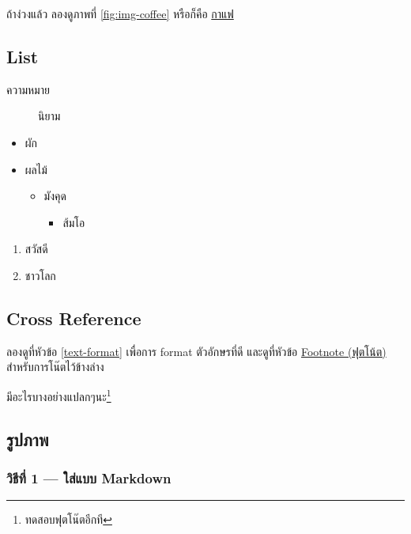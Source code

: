 \documentclass[
]{article}
\providecommand{\tightlist}{%
  \setlength{\itemsep}{0pt}\setlength{\parskip}{0pt}}
\begin{document}
ถ้าง่วงแล้ว ลองดูภาพที่ \ref{fig:img-coffee} หรือก็คือ \protect\hyperlink{coffee}{กาแฟ}

\hypertarget{list}{%
\subsection{List}\label{list}}

\begin{description}
\item[ความหมาย]
นิยาม
\end{description}

\begin{itemize}
\item
  ผัก
\item
  ผลไม้

  \begin{itemize}
  \item
    มังคุด

    \begin{itemize}
    \tightlist
    \item
      ส้มโอ
    \end{itemize}
  \end{itemize}
\end{itemize}

\begin{enumerate}
\def\labelenumi{\arabic{enumi}.}
\tightlist
\item
  สวัสดี
\item
  ชาวโลก
\end{enumerate}

\hypertarget{cross-reference}{%
\subsection{Cross Reference}\label{cross-reference}}

ลองดูที่หัวข้อ \ref{text-format} เพื่อการ format ตัวอักษรที่ดี และดูที่หัวข้อ \protect\hyperlink{footnote}{Footnote (ฟุตโน้ต)} สำหรับการโน๊ตไว้ข้างล่าง

มีอะไรบางอย่างแปลกๆนะ\footnote{ทดสอบฟุตโน๊ตอีกที}

\hypertarget{image}{%
\subsection{รูปภาพ}\label{image}}

\hypertarget{image-method1}{%
\subsubsection{วิธีที่ 1 --- ใส่แบบ Markdown}\label{image-method1}}
\end{document}

